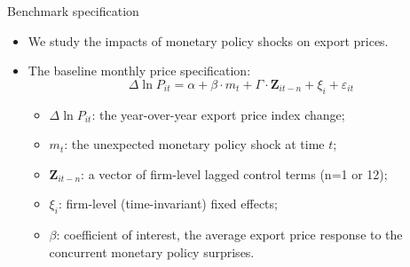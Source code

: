 \documentclass[10pt]{beamer}
\begin{document}
\begin{frame}{Benchmark specification}
    \begin{itemize}
        \item We study the impacts of monetary policy shocks on export prices.
        \item The baseline monthly price specification:
        \begin{equation}
            \Delta \ln P_{it} = \alpha+\beta \cdot m_{t}+ \Gamma \cdot \textbf{Z}_{it-n}+\xi_{i}+\varepsilon_{it}
         \end{equation}
        \begin{itemize}
            \item $\Delta \ln P_{it}$: the year-over-year export price index change;
            \item $m_t$: the unexpected monetary policy shock at time $t$;
            \item $\textbf{Z}_{it-n}$: a vector of firm-level lagged control terms (n=1 or 12);
            \item $\xi_{i}$: firm-level (time-invariant) fixed effects;
            \item $\beta$: coefficient of interest, the average export price response to the concurrent monetary policy surprises.
        \end{itemize}
    \end{itemize}
\end{frame}
\end{document}
